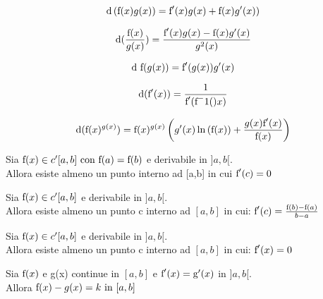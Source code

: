 		  \begin{thm}[]
		  \[
		  {\rm d}\left({\text{\text{f}}(x) g(x)}\right)=\text{\text{f}}'(x) g(x)+\text{\text{f}}(x)g'(x))
		  \]
		  \end{thm}
		  
		  \begin{thm}[]
		  \[
		  {\rm d}(\frac{\text{\text{f}}(x)}{g(x)})=\frac{\text{\text{f}}'(x)g(x)-\text{\text{f}}(x)g'(x)}{g^2(x)}
		  \]
		  \end{thm}
		  
		  \begin{thm}[]
		  \[
		  {\rm d}\text{ \text{f}}(g(x))=\text{\text{f}}'(g(x))g'(x)
		  \]
		  \end{thm}
		  
		  \begin{thm}[]
		  \[
		  {\rm d}(\text{\text{f}}'(x))=\frac{1}{\text{\text{f}}'(\text{\text{f}}^-1()x)}
		  \]
		  \end{thm}
		  
		  \begin{thm}[]
		  \[
		  {\rm d}(\text{\text{f}}(x)^{g(x)})=\text{\text{f}}(x)^{g(x)}\left({g'(x)\ln\left({\text{\text{f}}(x)}\right)+\frac{g(x)\text{\text{f}}'(x)}{\text{\text{f}}(x)}}\right)
		  \]
		  \end{thm}
		 	
		 	\begin{thm}[Rolle]
		  Sia $\text{f}(x)\in c'[a,b]\text{ con \text{f}}(a)=\text{\text{f}}(b)$ e derivabile in $]a,b[$.\\ Allora esiste almeno un punto interno ad [a,b] in cui $\text{f} '(c)=0$
		  
		  \end{thm}
		 	
		 	\begin{thm}[Lagrange]
		   Sia $\text{f}(x)\in c'[a,b]$ e derivabile in $]a,b[$.\\ Allora esiste almeno un punto c interno ad $[a,b]$ in cui:
		   $\text{f}'(c)=\frac{\text{\text{f}}(b)-\text{\text{f}}(a)}{b-a}$
		  \end{thm}
		  
		  	\begin{cor}[Lagrange 1]
		   Sia $\text{f}(x)\in c'[a,b]$ e derivabile in $]a,b[$.\\ Allora esiste almeno un punto c interno ad $[a,b]$ in cui:
		   $\text{f}'(x)=0$
		  \end{cor}

		  \begin{cor}[Lagrange 2]
		  Sia $\text{f}(x)$ e g(x) continue in $[a,b]$ e $\text{f}'(x)=\text{g}'(x)$ in $]a,b[$.\\ Allora $\text{f}(x)-g(x)=k \text{ in }[a,b]$
		  \end{cor}
		  
